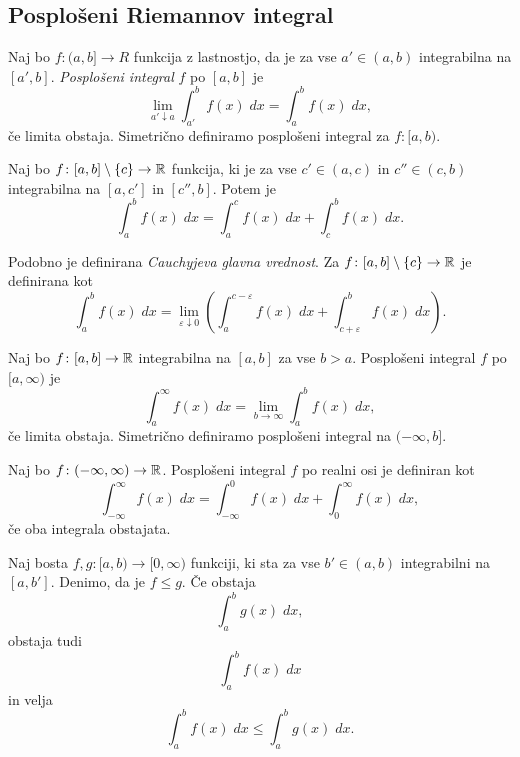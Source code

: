 \documentclass[12pt, a4paper]{article}
\begin{document}
\newpage

\subsection{Posplošeni Riemannov integral}

\begin{definicija}
Naj bo $f\colon(a,b]\to R$ funkcija z lastnostjo, da je za vse $a'\in(a,b)$ integrabilna na $[a',b]$. \emph{Posplošeni integral} $f$ po $[a,b]$ je
\[
\lim_{a'\downarrow a}\int_{a'}^b f(x)\;dx=\int_a^b f(x)\;dx,
\]
če limita obstaja. Simetrično definiramo posplošeni integral za $f\colon[a,b)$.
\end{definicija}

\begin{definicija}
Naj bo $f\colon[a,b]\setminus\left\{c\right\}\to\mathbb{R}$ funkcija, ki je za vse $c'\in(a,c)$ in $c''\in(c,b)$ integrabilna na $[a,c']$ in $[c'',b]$. Potem je
\[
\int_a^b f(x)\;dx=\int_a^c f(x)\;dx+\int_c^b f(x)\;dx.
\]
\end{definicija}

\begin{opomba}
Podobno je definirana \emph{Cauchyjeva glavna vrednost}. Za $f\colon[a,b]\setminus\left\{c\right\}\to\mathbb{R}$ je definirana kot
\[
\int_a^b f(x)\;dx=\lim_{\varepsilon\downarrow 0}\left(\int_a^{c-\varepsilon} f(x)\;dx + \int_{c+\varepsilon}^b f(x)\;dx\right).
\]
\end{opomba}

\begin{definicija}
Naj bo $f\colon[a,b]\to\mathbb{R}$ integrabilna na $[a,b]$ za vse $b>a$. Posplošeni integral $f$ po $[a,\infty)$ je
\[
\int_a^\infty f(x)\;dx=\lim_{b\to\infty}\int_a^b f(x)\;dx,
\]
če limita obstaja. Simetrično definiramo posplošeni integral na $(-\infty, b]$.
\end{definicija}

\begin{definicija}
Naj bo $f\colon(-\infty,\infty)\to\mathbb{R}$. Posplošeni integral $f$ po realni osi je definiran kot
\[
\int_{-\infty}^\infty f(x)\;dx=\int_{-\infty}^0 f(x)\;dx+\int_0^\infty f(x)\;dx,
\]
če oba integrala obstajata.
\end{definicija}

\begin{trditev}
Naj bosta $f,g\colon[a,b)\to[0,\infty)$ funkciji, ki sta za vse $b'\in(a,b)$ integrabilni na $[a,b']$. Denimo, da je $f\leq g$. Če obstaja
\[
\int_a^b g(x)\;dx,
\]
obstaja tudi
\[
\int_a^b f(x)\;dx
\]
in velja
\[
\int_a^b f(x)\;dx\leq \int_a^b g(x)\;dx.
\]
\end{trditev}
\end{document}

